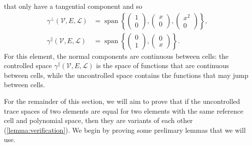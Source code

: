 \documentclass[sn-mathphys-num]{sn-jnl}%
\theoremstyle{thmstyleone}%
\newcommand{\subentity}{E}
\newcommand{\polyspace}{\mathcal{V}}
\newcommand{\dualbasis}{\mathcal{L}}
\newcommand{\unctrace}[3]{\gamma^\perp(#1,#2,#3)}
\newcommand{\ctrace}[3]{\gamma^\parallel(#1,#2,#3)}
\theoremstyle{thmstyletwo}%
\theoremstyle{thmstylethree}%
\begin{document}
that only have a tangential component and so
\begin{align*}
\unctrace{\polyspace}{\subentity}{\dualbasis}&=\operatorname{span}\left\{
\begin{pmatrix}1\\0\end{pmatrix},
\begin{pmatrix}x\\0\end{pmatrix},
\begin{pmatrix}x^2\\0\end{pmatrix}
\right\},\\
\ctrace{\polyspace}{\subentity}{\dualbasis}&=\operatorname{span}\left\{
\begin{pmatrix}0\\1\end{pmatrix},
\begin{pmatrix}0\\x\end{pmatrix}
\right\}.
\end{align*}
For this element, the normal components are continuous between cells:
the controlled space $\ctrace{\polyspace}{\subentity}{\dualbasis}$ is the space of functions that
are continuous between cells, while the uncontrolled space contains the functions that may jump
between cells.

For the remainder of this section, we will aim to prove that if the uncontrolled trace spaces
of two elements are equal for two elements with the same reference cell and polynomial space,
then they are variants of each other
(\cref{lemma:verification}).
We begin by proving some prelimary lemmas that we will use.
\end{document}
